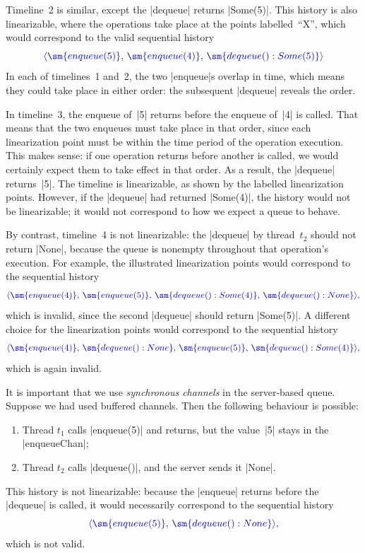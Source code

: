 
Timeline~2 is similar, except the |dequeue| returns |Some(5)|.  This history
is also linearizable, where the operations take place at the points
labelled~``{\scalashape X}'', which would correspond to the valid sequential
history
\[\mstyle
\seq{ \sm{enqueue(5)},\, \sm{enqueue(4)},\, \sm{dequeue():Some(5)}}
\]
In each of timelines~1 and~2, the two |enqueue|s overlap in time, which means
they could take place in either order: the subsequent |dequeue| reveals the
order. 


In timeline~3, the enqueue of~|5| returns before the enqueue of~|4| is called.
That means that the two enqueues must take place in that order, since each
linearization point must be within the time period of the operation execution.
This makes sense: if one operation returns before another is called, we would
certainly expect them to take effect in that order.  As a result, the
|dequeue| returns~|5|.  The timeline is linearizable, as shown by the labelled
linearization points.  However, if the |dequeue| had returned |Some(4)|, the
history would not be linearizable; it would not correspond to how we expect a
queue to behave.

By contrast, timeline~4 is not linearizable: the |dequeue| by thread~$t_2$
should not return |None|, because the queue is nonempty throughout that
operation's execution.  For example, the illustrated linearization points
would correspond to the sequential history
\[\mstyle
\seq{ \sm{enqueue(4)},\, \sm{enqueue(5)},\,
   \sm{dequeue():Some(4)},\, \sm{dequeue():None}},
\]
which is invalid, since the second |dequeue| should return |Some(5)|.  A
different choice for the linearization points would correspond to the
sequential history
\[\mstyle
\seq{ \sm{enqueue(4)},\, \sm{dequeue():None},\, \sm{enqueue(5)},\,
   \sm{dequeue():Some(4)}},
\]
which is again invalid.


It is important that we use \emph{synchronous channels} in the server-based
queue.  Suppose we had used buffered channels.  Then the following behaviour
is possible:
%
\begin{enumerate}
\item Thread $t_1$ calls |enqueue(5)| and returns, but the value~|5| stays in
  the |enqueueChan|;

\item Thread $t_2$ calls |dequeue()|, and the server sends it |None|.
\end{enumerate}
%
This history is not linearizable: because the |enqueue| returns before the
|dequeue| is called, it would necessarily correspond to the sequential history
\[\mstyle
\seq{ \sm{enqueue(5)},\, \sm{dequeue():None}},
\]
which is not valid.

